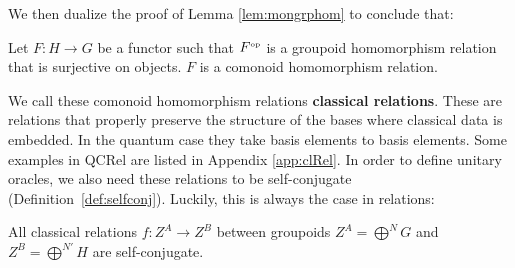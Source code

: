 We then dualize the proof of Lemma \ref{lem:mongrphom} to conclude that:
\begin{lemma}
\label{lem:classicalRelation}
Let $F:H\to G$ be a functor such that $F^{\mbox{\tiny op}}$ is a groupoid homomorphism relation that is surjective on objects. $F$ is a comonoid homomorphism relation.
\end{lemma}
\noindent We call these comonoid homomorphism relations \textbf{classical relations}. These are relations that properly preserve the structure of the bases where classical data is embedded.  In the quantum case they take basis elements to basis elements. Some examples in QCRel are listed in Appendix \ref{app:clRel}. In order to define unitary oracles, we also need these relations to be self-conjugate (Definition~\ref{def:selfconj}). Luckily, this is always the case in relations:
\begin{lemma}
All classical relations $f:Z^A\to Z^B$ between groupoids $Z^A=\bigoplus^NG$ and $Z^B=\bigoplus^{N'}H$ are self-conjugate.
\end{lemma}

